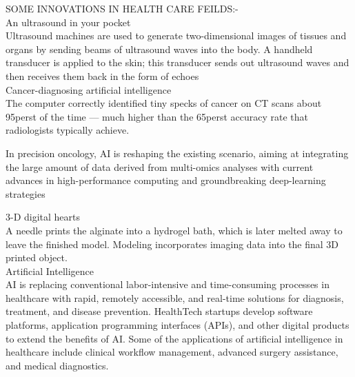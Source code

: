 \documentclass[12pt]{article}
\begin{document}
\begin{flushleft}
SOME INNOVATIONS IN HEALTH CARE FEILDS:-\\
[1cm]

\textsf{\large An ultrasound in your pocket}\\
[0.5cm]
 Ultrasound machines are used to generate two-dimensional images of tissues and organs by sending beams of ultrasound waves into the body. A handheld transducer is applied to the skin; this transducer sends out ultrasound waves and then receives them back in the form of echoes\\
 [0.45cm]

\textsf{\large Cancer-diagnosing artificial intelligence}\\
[0.5cm]
The computer correctly identified tiny specks of cancer on CT scans about 95perst  of the time — much higher than the 65perst accuracy rate that radiologists typically achieve.

In precision oncology, AI is reshaping the existing scenario, aiming at integrating the large amount of data derived from multi-omics analyses with current advances in high-performance computing and groundbreaking deep-learning strategies

\textsf{\large 3-D digital hearts}\\
[0.5cm]
A needle prints the alginate into a hydrogel bath, which is later melted away to leave the finished model. Modeling incorporates imaging data into the final 3D printed object.\\
[0.5cm]


\textsf{\large Artificial Intelligence }\\
[0.45cm]



\textsf{\small AI is replacing conventional labor-intensive and time-consuming processes in healthcare with rapid, remotely accessible, and real-time solutions for diagnosis, treatment, and disease prevention. HealthTech startups develop software platforms, application programming interfaces (APIs), and other digital products to extend the benefits of AI. Some of the applications of artificial intelligence in healthcare include clinical workflow management, advanced surgery assistance, and medical diagnostics.  }     

\end{flushleft}
\end{document}
